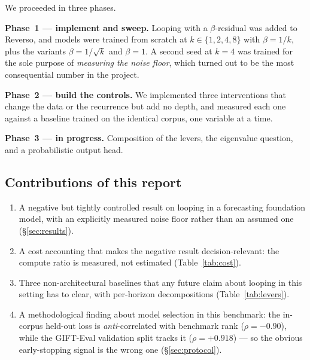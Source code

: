We proceeded in three phases.

\textbf{Phase~1 --- implement and sweep.} Looping with a $\beta$-residual was
added to Reverso, and models were trained from scratch at
$k\in\{1,2,4,8\}$ with $\beta = 1/k$, plus the variants $\beta=1/\sqrt{k}$ and
$\beta=1$. A second seed at $k=4$ was trained for the sole purpose of
\emph{measuring the noise floor}, which turned out to be the most consequential
number in the project.

\textbf{Phase~2 --- build the controls.} We implemented three interventions
that change the data or the recurrence but add no depth, and measured each one
against a baseline trained on the identical corpus, one variable at a time.

\textbf{Phase~3 --- in progress.} Composition of the levers, the eigenvalue
question, and a probabilistic output head.

\subsection{Contributions of this report}

\begin{enumerate}
  \item A negative but tightly controlled result on looping in a forecasting
        foundation model, with an explicitly measured noise floor rather than
        an assumed one (\S\ref{sec:results}).
  \item A cost accounting that makes the negative result decision-relevant:
        the compute ratio is measured, not estimated (Table~\ref{tab:cost}).
  \item Three non-architectural baselines that any future claim about looping
        in this setting has to clear, with per-horizon decompositions
        (Table~\ref{tab:levers}).
  \item A methodological finding about model selection in this benchmark: the
        in-corpus held-out loss is \emph{anti}-correlated with benchmark rank
        ($\rho=-0.90$), while the GIFT-Eval validation split tracks it
        ($\rho=+0.918$) --- so the obvious early-stopping signal is the wrong
        one (\S\ref{sec:protocol}).
\end{enumerate}
